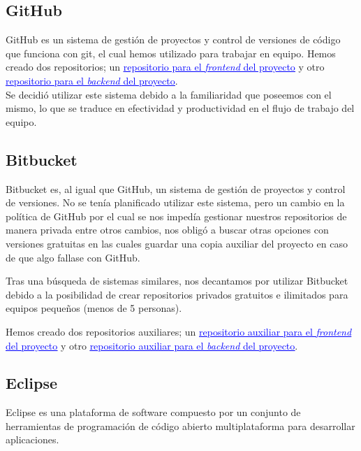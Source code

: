      \subsection{GitHub}
     GitHub\cite{github} es un sistema de gestión de proyectos y control de versiones de código que funciona con git, el cual hemos utilizado para trabajar en equipo. Hemos creado dos repositorios; un  \href{https://github.com/myscel/tfg-estudio-medico-front}{\textcolor{blue}{\underline{repositorio para el \textit{frontend} del proyecto}}} y otro  \href{https://github.com/myscel/tfg-estudio-medico-back}{\textcolor{blue}{\underline{repositorio para el \textit{backend} del proyecto}}}. \\
     \newline
     Se decidió utilizar este sistema debido a la familiaridad que poseemos con el mismo, lo que se traduce en efectividad y productividad en el flujo de trabajo del equipo.
     
 

     \subsection{Bitbucket}
     Bitbucket\cite{bitbucket} es, al igual que GitHub, un sistema de gestión de proyectos y control de versiones. No se tenía planificado utilizar este sistema, pero un cambio en la política de GitHub por el cual se nos impedía gestionar nuestros repositorios de manera privada entre otros cambios, nos obligó a buscar otras opciones con versiones gratuitas en las cuales guardar una copia auxiliar del proyecto en caso de que algo fallase con GitHub.
     \newline
     
     Tras una búsqueda de sistemas similares, nos decantamos por utilizar Bitbucket debido a la posibilidad de crear repositorios privados gratuitos e ilimitados para equipos pequeños (menos de 5 personas). \newline
     
     Hemos creado dos repositorios auxiliares; un  \href{https://bitbucket.org/myscel/tfg-estudio-medico-front/src/master/}{\textcolor{blue}{\underline{repositorio auxiliar para el \textit{frontend} del proyecto}}} y otro  \href{https://bitbucket.org/myscel/tfg-estudio-medico-back/src/master/}{\textcolor{blue}{\underline{repositorio auxiliar para el \textit{backend} del proyecto}}}.
     
     \subsection{Eclipse}
     Eclipse\cite{eclipse} es una plataforma de software compuesto por un conjunto de herramientas de programación de código abierto multiplataforma para desarrollar aplicaciones.
     \newline
     

